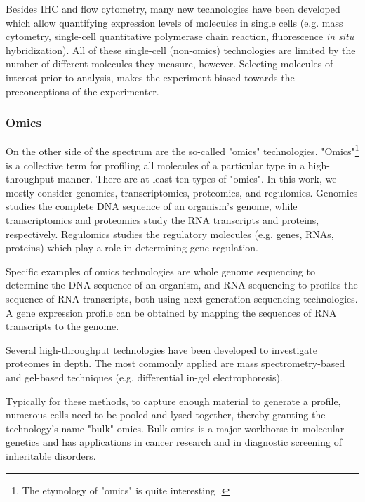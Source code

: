 Besides IHC and flow cytometry, many new technologies have been developed which allow quantifying expression levels of molecules in single cells (e.g. mass cytometry, single-cell quantitative polymerase chain reaction, fluorescence \emph{in situ} hybridization). All of these single-cell (non-omics) technologies are limited by the number of different molecules they measure, however. Selecting molecules of interest prior to analysis, makes the experiment biased towards the preconceptions of the experimenter.

\subsubsection{Omics}
On the other side of the spectrum are the so-called "omics" technologies. "Omics"\footnote{The etymology of "omics" is quite interesting \cite{yadav_wholenesssuffixomics_2007}.} is a collective term for profiling all molecules of a particular type in a high-throughput manner.
There are at least ten types of "omics". In this work, we mostly consider genomics, transcriptomics, proteomics, and regulomics. Genomics studies the complete DNA sequence of an organism's genome, while transcriptomics and proteomics study the RNA transcripts and proteins, respectively. Regulomics studies the regulatory molecules (e.g. genes, RNAs, proteins) which play a role in determining gene regulation.

Specific examples of omics technologies are whole genome sequencing to determine the DNA sequence of an organism, and RNA sequencing to profiles the sequence of RNA transcripts, both using next-generation sequencing technologies. A gene expression profile can be obtained by mapping the sequences of RNA transcripts to the genome.

Several high-throughput technologies have been developed to investigate proteomes in depth. The most commonly applied are mass spectrometry-based and gel-based techniques (e.g. differential in-gel electrophoresis).


Typically for these methods, to capture enough material to generate a profile, numerous cells need to be pooled and lysed together, thereby granting the technology's name "bulk" omics.
Bulk omics is a major workhorse in molecular genetics and has applications in cancer research and in diagnostic screening of inheritable disorders.

